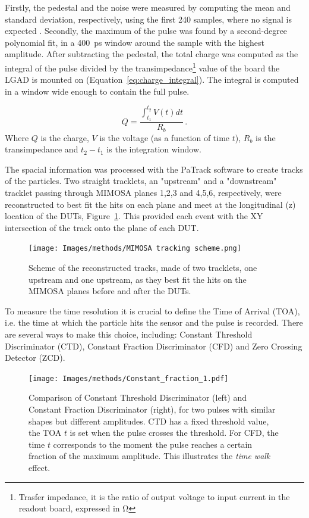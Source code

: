 Firstly, the pedestal and the noise were measured by computing the mean and standard deviation, respectively, using the first 240 samples, where no signal is expected \cite{Allaire:2018bof}. Secondly, the maximum of the pulse was found by a second-degree polynomial fit, in a \qty{400}{\pico\second} window around the sample with the highest amplitude. After subtracting the pedestal, the total charge was computed as the integral of the pulse divided by the transimpedance\footnote{Trasfer impedance, it is the ratio of output voltage to input current in the readout board, expressed in \unit{\ohm}} value of the board the LGAD is mounted on (Equation~\ref{eq:charge_integral}). The integral is computed in a window wide enough to contain the full pulse.

\begin{equation}\label{eq:charge_integral}
    Q = \frac{\int_{t_1}^{t_2} V(t)dt}{R_b} \, .
\end{equation}
Where \(Q\) is the charge, \(V\) is the voltage (as a function of time \(t\)), \(R_b\) is the transimpedance and \(t_2-t_1\) is the integration window.

The spacial information was processed with the PaTrack software to create tracks of the particles. Two straight tracklets, an "upstream" and a "downstream" tracklet passing through MIMOSA planes 1,2,3 and 4,5,6, respectively, were reconstructed to best fit the hits on each plane and meet at the longitudinal (z) location of the DUTs, Figure~\ref{fig:mimosa_tracking}. This provided each event with the XY intersection of the track onto the plane of each DUT. 

\begin{figure}[h!btp]
    \centering
    \texttt{[image: Images/methods/MIMOSA tracking scheme.png]}
    \captionsetup{width=\captionwidth}
    \caption{Scheme of the reconstructed tracks, made of two tracklets, one upstream and one upstream, as they best fit the hits on the MIMOSA planes before and after the DUTs.}
    \label{fig:mimosa_tracking}
\end{figure} 


To measure the time resolution it is crucial to define the Time of Arrival (TOA), i.e. the time at which the particle hits the sensor and the pulse is recorded. There are several ways to make this choice, including: Constant Threshold Discriminator (CTD), Constant Fraction Discriminator (CFD) and Zero Crossing Detector (ZCD).

\begin{figure}[h!btp]
    \centering
    \texttt{[image: Images/methods/Constant\_fraction\_1.pdf]}
    \captionsetup{width=\captionwidth}
    \caption{Comparison of Constant Threshold Discriminator (left) and Constant Fraction Discriminator (right), for two pulses with similar shapes but different amplitudes. CTD has a fixed threshold value, the TOA \(t\) is set when the pulse crosses the threshold. For CFD, the time \(t\) corresponds to the moment the pulse reaches a certain fraction of the maximum amplitude. This illustrates the \textit{time walk} effect.}
    \label{fig:constant fraction}
\end{figure} 


